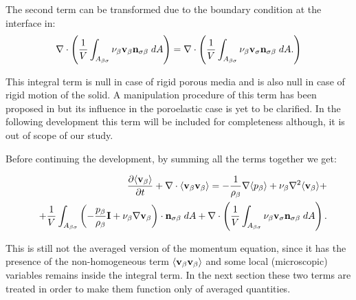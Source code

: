 The second term can be transformed due to the boundary condition at the interface in:
$$
\nabla \cdot \left( \dfrac{1}{V} \int_{A_{\beta \sigma}}  \nu_{\beta} \textbf{v}_{\beta} \mathbf{n}_{\sigma \beta} \;dA \right) = \nabla \cdot \left( \dfrac{1}{V} \int_{A_{\beta \sigma}}  \nu_{\beta} \textbf{v}_{\sigma} \mathbf{n}_{\sigma \beta} \;dA. \right)
$$

\noindent This integral term is null in case of rigid porous media and is also null in case of rigid motion of the solid. A manipulation procedure of this term has been proposed in \citet{hussong2011continuum} but its influence in the poroelastic case is yet to be clarified. In the following development this term will be included for completeness although, it is out of scope of our study.



\noindent Before continuing the development, by summing all the terms together we get:

\begin{eqnarray}
&& \dfrac{\partial {\left< \textbf{v}_{\beta}\right>}}{\partial t} + \nabla \cdot {\left< \textbf{v}_{\beta}\textbf{v}_{\beta}\right>} = -\dfrac{1}{\rho_{\beta}} \nabla {\left< p_{\beta}\right>} + \nu_{\beta}\nabla^2 {\left< \textbf{v}_{\beta} \right>} + \nonumber \\
&& +\dfrac{1}{V} \int_{A_{\beta \sigma}} \left( -\dfrac{p_{\beta}}{\rho_{\beta}} \mathbf{I} + \nu_{\beta} \nabla \textbf{v}_{\beta}  \right)\cdot \mathbf{n}_{\sigma \beta} \;dA +  \nabla \cdot \left( \dfrac{1}{V} \int_{A_{\beta \sigma}}  \nu_{\beta} \textbf{v}_{\sigma} \mathbf{n}_{\sigma \beta} \;dA \right). \nonumber
\label{eq:mom_2}
\end{eqnarray}

This is still not the averaged version of the momentum equation, since it has the presence of the non-homogeneous term ${\left< \textbf{v}_{\beta}\textbf{v}_{\beta} \right>}$ and some local (microscopic) variables remains inside the integral term.
In the next section these two terms are treated in order to make them function only of averaged quantities.

